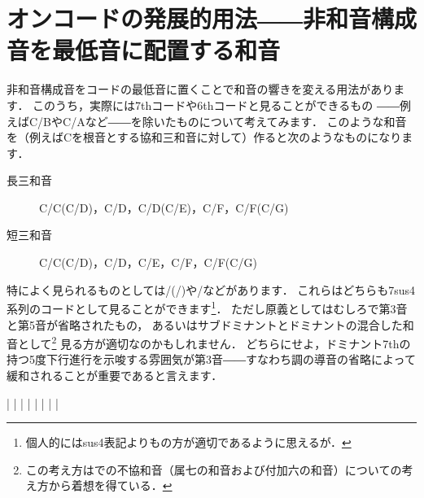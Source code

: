 \documentclass[dvipdfmx,uplatex,b5paper,openany,jbase=12Q,nomag*,textwidth-limit=44%
               ]{gachimuchi}[2020/05/05]
\begin{document}
\section{オンコードの発展的用法――非和音構成音を最低音に配置する和音}
非和音構成音をコードの最低音に置くことで和音の響きを変える用法があります．
このうち，実際には7thコードや6thコードと見ることができるもの
――例えばC/B\aFlat やC/Aなど――を除いたものについて考えてみます．
このような和音を（例えばCを根音とする協和三和音に対して）作ると次のようなものになります．

\begin{description}
  \item[長三和音] C/C\aSharp(C/D\aFlat)，C/D，C/D\aSharp(C/E\aFlat)，C/F，C/F\aSharp(C/G\aFlat)
  \item[短三和音] C\Min/C\aSharp(C\Min/D\aFlat)，C\Min/D，C\Min/E，C\Min/F，C\Min/F\aSharp(C\Min/G\aFlat)
\end{description}

特によく見られるものとしては\Gniv /\Gnv (\Gniv\Min/\Gnv )や\Gnii\Min{}/\Gnv などがあります．
これらはどちらも\Gnv\subsc7sus4系列のコードとして見ることができます\footnote{
  個人的にはsus4表記よりもの方が適切であるように思えるが．
}．
ただし原義としてはむしろ\Gnv{}で第3音と第5音が省略されたもの，
あるいはサブドミナントとドミナントの混合した和音として\footnote{%
  この考え方は\cite{chRAMEAU1}での不協和音（属七の和音および付加六の和音）についての考え方から着想を得ている．
}%
見る方が適切なのかもしれません．
どちらにせよ，ドミナント7thの持つ5度下行進行を示唆する雰囲気が第3音――すなわち調の導音の省略によって
緩和されることが重要であると言えます．

\begin{Music}%
  \generalmeter{\meterC}%
  \Startpiece
  \NOTes%
  |%
  \en%
  \NOTes%
  |%
  \en\bar%
  \Notes|%
  \en{}%
  \setdoublebar
  \endpiece
  \Startpiece%
  \NOTes%
  |%
  \en%
  \NOTes%
  |%
  \en\bar%
  \Notes|%
  \en\setdoublebar
  \endpiece
\end{Music}
\end{document}
